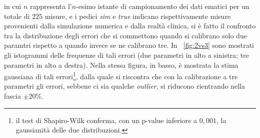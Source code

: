 in cui $n$ rappresenta l'$n$-esimo istante di campionamento dei dati ematici per un totale di $225$ misure, e i pedici \textit{sim} e \textit{true} indicano rispettivamente misure provenienti dalla simulazione numerica e dalla realtà clinica, si è fatto il confronto tra la distribuzione degli errori che si commettono quando si calibrano solo due paramtri rispetto a quando invece se ne calibrano tre. In \figurename~\ref{fig:2vs3} sono mostrati gli istogrammi delle frequenze di tali errori (due parametri in alto a sinistra; tre parametri in alto a destra). Nella stessa figura, in basso, è mostrata la stima gaussiana di tali errori\footnote{il test di Shapiro-Wilk conferma, con un p-value inferiore a $0,001$, la gaussianità delle due distribuzioni.}, dalla quale si riscontra che con la calibrazione a tre parametri gli errori, sebbene ci sia qualche \textit{outlier}, si riducono rientrando nella fascia $\pm 20\%$.
